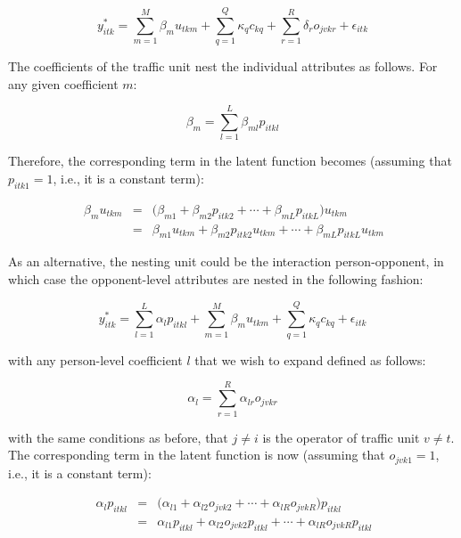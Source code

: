 \documentclass[]{elsarticle} %
\begin{document}
\begin{equation}
\label{eq:latent-function-with-hierarchical-traffic-unit}
y_{itk}^*=\sum_{m=1}^M\beta_mu_{tkm} + \sum_{q=1}^Q\kappa_qc_{kq} + \sum_{r=1}^R\delta_ro_{jvkr} + \epsilon_{itk}
\end{equation}

The coefficients of the traffic unit nest the individual attributes as
follows. For any given coefficient \(m\):

\begin{equation}
\label{eq:hierarchical-traffic-unit-coefficients}
\beta_{m}=\sum_{l=1}^L\beta_{ml}p_{itkl} 
\end{equation}

Therefore, the corresponding term in the latent function becomes
(assuming that \(p_{itk1} = 1\), i.e., it is a constant term):

\begin{equation}
\label{eq:hierarchical-traffic-unit-coefficients}
\begin{array}{rcl}\
\beta_{m}u_{tkm} &=& \big( \beta_{m1} + \beta_{m2}p_{itk2} + \cdots + \beta_{mL}p_{itkL}\big)u_{tkm}\\ 
&=& \beta_{m1}u_{tkm} + \beta_{m2}p_{itk2}u_{tkm} + \cdots + \beta_{mL}p_{itkL}u_{tkm}
\end{array}
\end{equation}

As an alternative, the nesting unit could be the interaction
person-opponent, in which case the opponent-level attributes are nested
in the following fashion:

\begin{equation}
\label{eq:latent-function-with-opponent-variables}
y_{itk}^*=\sum_{l=1}^L\alpha_lp_{itkl} + \sum_{m=1}^M\beta_mu_{tkm} + \sum_{q=1}^Q\kappa_qc_{kq} + \epsilon_{itk}
\end{equation}

\noindent with any person-level coefficient \(l\) that we wish to expand
defined as follows:

\begin{equation}
\label{eq:hierarchical-traffic-unit-coefficients}
\alpha_{l}=\sum_{r=1}^R\alpha_{lr}o_{jvkr}
\end{equation}

\noindent with the same conditions as before, that \(j\ne i\) is the
operator of traffic unit \(v\ne t\). The corresponding term in the
latent function is now (assuming that \(o_{jvk1}=1\), i.e., it is a
constant term):

\begin{equation}
\label{eq:hierarchical-traffic-unit-coefficients}
\begin{array}{rcl}\
\alpha_{l}p_{itkl} &=& \big(\alpha_{l1} + \alpha_{l2}o_{jvk2} + \cdots + \alpha_{lR}o_{jvkR} \big)p_{itkl}\\
&=& \alpha_{l1}p_{itkl} + \alpha_{l2}o_{jvk2}p_{itkl} + \cdots + \alpha_{lR}o_{jvkR}p_{itkl}
\end{array} 
\end{equation}
\end{document}

